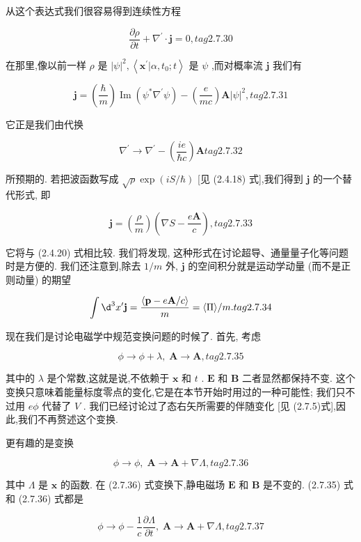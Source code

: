 \documentclass[lang=cn,newtx,10pt,scheme=chinese,thmcnt=section]{elegantbook}
\begin{document}
从这个表达式我们很容易得到连续性方程

$$
\frac{\partial \rho }{\partial t} + {\nabla }^{\prime } \cdot \mathbf{j} = 0, tag{2. 7.30}
$$

在那里,像以前一样 $\rho$ 是 ${\left| \psi \right| }^{2},\left\langle {{\mathbf{x}}^{\prime } | \alpha ,{t}_{0};t}\right\rangle$ 是 $\psi$ ,而对概率流 $\mathbf{j}$ 我们有

$$
\mathbf{j} = \left( \frac{\hbar }{m}\right) \operatorname{Im}\left( {{\psi }^{ * }{\nabla }^{\prime }\psi }\right) - \left( \frac{e}{mc}\right) \mathbf{A}{\left| \psi \right| }^{2}, tag{2. 7.31}
$$

它正是我们由代换

$$
{\nabla }^{\prime } \rightarrow {\nabla }^{\prime } - \left( \frac{ie}{\hbar c}\right) \mathbf{A} tag{2. 7.32}
$$

所预期的. 若把波函数写成 $\sqrt{\rho }\exp \left( {{iS}/\hbar }\right)$ [见 (2.4.18) 式],我们得到 $\mathbf{j}$ 的一个替代形式, 即

$$
\mathbf{j} = \left( \frac{\rho }{m}\right) \left( {\nabla S - \frac{e\mathbf{A}}{c}}\right) , tag{2. 7.33}
$$

它将与 (2.4.20) 式相比较. 我们将发现, 这种形式在讨论超导、通量量子化等问题时是方便的. 我们还注意到,除去 $1/m$ 外, $\mathbf{j}$ 的空间积分就是运动学动量 (而不是正则动量) 的期望

$$
\int {\d}^{3}{x}^{\prime }\mathbf{j} = \frac{\langle \mathbf{p} - e\mathbf{A}/c\rangle }{m} = \langle \Pi \rangle /m. tag{2. 7.34}
$$

现在我们是讨论电磁学中规范变换问题的时候了. 首先, 考虑

$$
\phi \rightarrow \phi + \lambda ,\;\mathbf{A} \rightarrow \mathbf{A}, tag{2. 7.35}
$$

其中的 $\lambda$ 是个常数,这就是说,不依赖于 $\mathbf{x}$ 和 $t$ . $\mathbf{E}$ 和 $\mathbf{B}$ 二者显然都保持不变. 这个变换只意味着能量标度零点的变化,它是在本节开始时用过的一种可能性; 我们只不过用 ${e\phi }$ 代替了 $V$ . 我们已经讨论过了态右矢所需要的伴随变化 [见 (2.7.5)式],因此,我们不再赘述这个变换.

更有趣的是变换

$$
\phi \rightarrow \phi ,\;\mathbf{A} \rightarrow \mathbf{A} + \nabla \Lambda , tag{2. 7.36}
$$

其中 $\Lambda$ 是 $\mathbf{x}$ 的函数. 在 (2.7.36) 式变换下,静电磁场 $\mathbf{E}$ 和 $\mathbf{B}$ 是不变的. (2.7.35) 式和 (2.7.36) 式都是

$$
\phi \rightarrow \phi - \frac{1}{c}\frac{\partial \Lambda }{\partial t},\;\mathbf{A} \rightarrow \mathbf{A} + \nabla \Lambda , tag{2. 7.37}
$$
\end{document}
